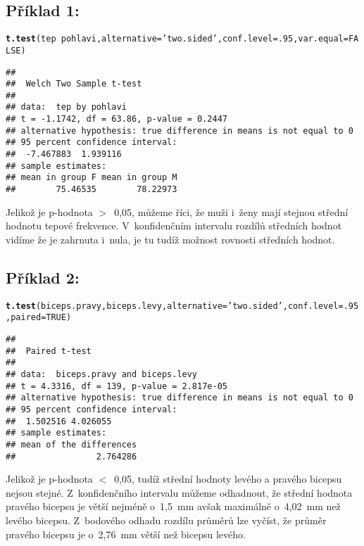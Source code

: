 \documentclass[twoside]{article}\usepackage[]{graphicx}\usepackage[]{color}
\makeatletter
\newcommand{\hlnum}[1]{\textcolor[rgb]{0.686,0.059,0.569}{#1}}%
\newcommand{\hlstr}[1]{\textcolor[rgb]{0.192,0.494,0.8}{#1}}%
\newcommand{\hlopt}[1]{\textcolor[rgb]{0,0,0}{#1}}%
\newcommand{\hlstd}[1]{\textcolor[rgb]{0.345,0.345,0.345}{#1}}%
\newcommand{\hlkwc}[1]{\textcolor[rgb]{0.333,0.667,0.333}{#1}}%
\newcommand{\hlkwd}[1]{\textcolor[rgb]{0.737,0.353,0.396}{\textbf{#1}}}%
\newenvironment{kframe}{%
 \def\at@end@of@kframe{}%
 \ifinner\ifhmode%
  \def\at@end@of@kframe{\end{minipage}}%
  \begin{minipage}{\columnwidth}%
 \fi\fi%
 \def\FrameCommand##1{\hskip\@totalleftmargin \hskip-\fboxsep
 \colorbox{shadecolor}{##1}\hskip-\fboxsep
     \hskip-\linewidth \hskip-\@totalleftmargin \hskip\columnwidth}%
 \MakeFramed {\advance\hsize-\width
   \@totalleftmargin\z@ \linewidth\hsize
   \@setminipage}}%
 {\par\unskip\endMakeFramed%
 \at@end@of@kframe}
\newenvironment{knitrout}{}{} %
\makeatother
\begin{document}
\subsection*{Příklad 1:}
\begin{knitrout}
\color{fgcolor}\begin{kframe}
\begin{alltt}
\hlkwd{t.test}\hlstd{(tep}\hlopt{~}\hlstd{pohlavi,} \hlkwc{alternative}\hlstd{=}\hlstr{'two.sided'}\hlstd{,} \hlkwc{conf.level}\hlstd{=}\hlnum{.95}\hlstd{,} \hlkwc{var.equal}\hlstd{=}\hlnum{FALSE}\hlstd{)}
\end{alltt}
\begin{verbatim}
## 
## 	Welch Two Sample t-test
## 
## data:  tep by pohlavi
## t = -1.1742, df = 63.86, p-value = 0.2447
## alternative hypothesis: true difference in means is not equal to 0
## 95 percent confidence interval:
##  -7.467883  1.939116
## sample estimates:
## mean in group F mean in group M 
##        75.46535        78.22973
\end{verbatim}
\end{kframe}
\end{knitrout}
Jelikož je p-hodnota $>$~0,05, můžeme říci, že muži i~ženy mají stejnou střední hodnotu tepové frekvence. V~konfidenčním intervalu rozdílů středních hodnot vidíme že je zahrnuta i~nula, je tu tudíž možnost rovnosti středních hodnot.

\subsection*{Příklad 2:}
\begin{knitrout}
\color{fgcolor}\begin{kframe}
\begin{alltt}
\hlkwd{t.test}\hlstd{(biceps.pravy, biceps.levy,} \hlkwc{alternative}\hlstd{=}\hlstr{'two.sided'}\hlstd{,} \hlkwc{conf.level}\hlstd{=}\hlnum{.95}\hlstd{,} \hlkwc{paired}\hlstd{=}\hlnum{TRUE}\hlstd{)}
\end{alltt}
\begin{verbatim}
## 
## 	Paired t-test
## 
## data:  biceps.pravy and biceps.levy
## t = 4.3316, df = 139, p-value = 2.817e-05
## alternative hypothesis: true difference in means is not equal to 0
## 95 percent confidence interval:
##  1.502516 4.026055
## sample estimates:
## mean of the differences 
##                2.764286
\end{verbatim}
\end{kframe}
\end{knitrout}
Jelikož je p-hodnota $<$~0,05, tudíž střední hodnoty levého a pravého bicepsu nejsou stejné. Z~konfidenčního intervalu můžeme odhadnout, že střední hodnota pravého bicepsu je větší nejméně o~1,5~\si{\milli\metre} avšak maximálně o~4,02~\si{\milli\metre} než levého bicepsu. Z~bodového odhadu rozdílu průměrů lze vyčíst, že průměr pravého bicepsu je o~2,76~\si{\milli\metre} větší než bicepsu levého.
\end{document}
